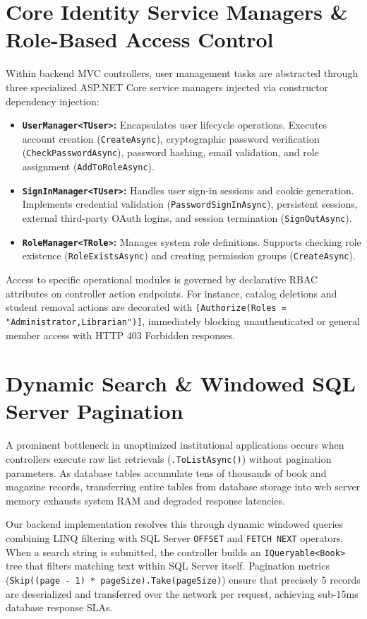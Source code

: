 \documentclass[11pt,a4paper]{report}
\begin{document}
\section{Core Identity Service Managers \& Role-Based Access Control}
Within backend MVC controllers, user management tasks are abstracted through three specialized ASP.NET Core service managers injected via constructor dependency injection:
\begin{itemize}[leftmargin=1.5em]
    \item \textbf{\texttt{UserManager<TUser>}:} Encapsulates user lifecycle operations. Executes account creation (\texttt{CreateAsync}), cryptographic password verification (\texttt{CheckPasswordAsync}), password hashing, email validation, and role assignment (\texttt{AddToRoleAsync}).
    \item \textbf{\texttt{SignInManager<TUser>}:} Handles user sign-in sessions and cookie generation. Implements credential validation (\texttt{PasswordSignInAsync}), persistent sessions, external third-party OAuth logins, and session termination (\texttt{SignOutAsync}).
    \item \textbf{\texttt{RoleManager<TRole>}:} Manages system role definitions. Supports checking role existence (\texttt{RoleExistsAsync}) and creating permission groups (\texttt{CreateAsync}).
\end{itemize}

Access to specific operational modules is governed by declarative RBAC attributes on controller action endpoints. For instance, catalog deletions and student removal actions are decorated with \texttt{[Authorize(Roles = "Administrator,Librarian")]}, immediately blocking unauthenticated or general member access with HTTP 403 Forbidden responses.

\section{Dynamic Search \& Windowed SQL Server Pagination}
A prominent bottleneck in unoptimized institutional applications occurs when controllers execute raw list retrievals (\texttt{.ToListAsync()}) without pagination parameters. As database tables accumulate tens of thousands of book and magazine records, transferring entire tables from database storage into web server memory exhausts system RAM and degraded response latencies.

Our backend implementation resolves this through dynamic windowed queries combining LINQ filtering with SQL Server \texttt{OFFSET} and \texttt{FETCH NEXT} operators. When a search string is submitted, the controller builds an \texttt{IQueryable<Book>} tree that filters matching text within SQL Server itself. Pagination metrics (\texttt{Skip((page - 1) * pageSize).Take(pageSize)}) ensure that precisely 5 records are deserialized and transferred over the network per request, achieving sub-15ms database response SLAs.
\end{document}
